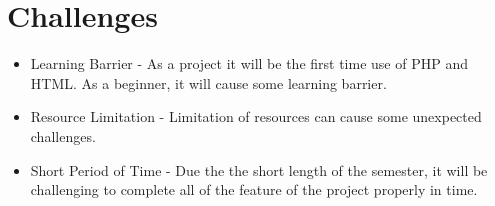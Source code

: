 \documentclass[14pt]{report}
\begin{document}
\section*{\LARGE Challenges}

\begin{Large}
\begin{itemize}
    \item Learning Barrier - As a project it will be the first time use of PHP and HTML. As a beginner, it will cause some learning barrier.
    \item Resource Limitation -  Limitation of resources can cause some unexpected challenges.
    \item Short Period of Time - Due the the short length of the semester, it will be challenging to complete all of the feature of the project properly in time.
\end{itemize}
\end{Large}

\newpage
\end{document}
